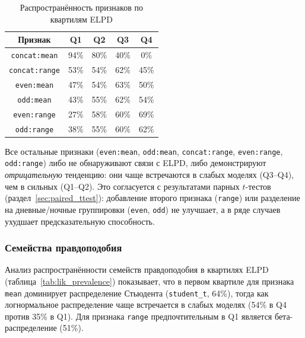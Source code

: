\documentclass[14pt]{mmcs_article}
\begin{document}
	\begin{table}[H]
		\centering
		\caption{Распространённость признаков по квартилям ELPD}
		\label{tab:feature_prevalence}
		\begin{tabular}{|c|c|c|c|c|}
			\hline
			\textbf{Признак} & \textbf{Q1} & \textbf{Q2} & 
			\textbf{Q3} & \textbf{Q4} \\
			\hline
			\texttt{concat:mean} & 94\% & 80\% & 40\% & 0\% \\
			\hline
			\texttt{concat:range} & 53\% & 54\% & 62\% & 45\% \\
			\hline
			\texttt{even:mean} & 47\% & 54\% & 63\% & 50\% \\
			\hline
			\texttt{odd:mean} & 43\% & 55\% & 62\% & 54\% \\
			\hline
			\texttt{even:range} & 27\% & 58\% & 60\% & 69\% \\
			\hline
			\texttt{odd:range} & 38\% & 55\% & 60\% & 62\% \\
			\hline
		\end{tabular}
	\end{table}
	
	Все остальные признаки (\texttt{even:mean}, \texttt{odd:mean},
	\texttt{concat:range}, \texttt{even:range}, \texttt{odd:range})
	либо не обнаруживают связи с ELPD, либо демонстрируют
	\textit{отрицательную} тенденцию: они чаще встречаются в
	слабых моделях (Q3--Q4), чем в сильных (Q1--Q2). Это
	согласуется с результатами парных $t$-тестов
	(раздел~\ref{sec:paired_ttest}): добавление второго признака
	(\texttt{range}) или разделение на дневные/ночные группировки
	(\texttt{even}, \texttt{odd}) не улучшает, а в ряде случаев
	ухудшает предсказательную способность.
	
	\subsubsection*{Семейства правдоподобия}
	
	Анализ распространённости семейств правдоподобия в квартилях
	ELPD (таблица~\ref{tab:lik_prevalence}) показывает, что в
	первом квартиле для признака \texttt{mean} доминирует
	распределение Стьюдента (\texttt{student\_t}, 64\%), тогда как
	логнормальное распределение чаще встречается в слабых моделях
	(54\% в Q4 против 35\% в Q1). Для признака \texttt{range}
	предпочтительным в Q1 является бета-распределение (51\%).
	
\end{document}
